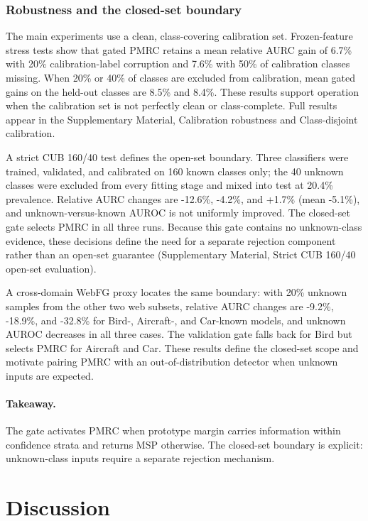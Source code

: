 \documentclass[review,times]{elsarticle}
\begin{document}
\subsubsection{Robustness and the closed-set boundary}

The main experiments use a clean, class-covering calibration set. Frozen-feature stress tests show that gated PMRC retains a mean relative AURC gain of 6.7\% with 20\% calibration-label corruption and 7.6\% with 50\% of calibration classes missing. When 20\% or 40\% of classes are excluded from calibration, mean gated gains on the held-out classes are 8.5\% and 8.4\%. These results support operation when the calibration set is not perfectly clean or class-complete. Full results appear in the Supplementary Material, Calibration robustness and Class-disjoint calibration.

A strict CUB 160/40 test defines the open-set boundary. Three classifiers were trained, validated, and calibrated on 160 known classes only; the 40 unknown classes were excluded from every fitting stage and mixed into test at 20.4\% prevalence. Relative AURC changes are -12.6\%, -4.2\%, and +1.7\% (mean -5.1\%), and unknown-versus-known AUROC is not uniformly improved. The closed-set gate selects PMRC in all three runs. Because this gate contains no unknown-class evidence, these decisions define the need for a separate rejection component rather than an open-set guarantee (Supplementary Material, Strict CUB 160/40 open-set evaluation).

A cross-domain WebFG proxy locates the same boundary: with 20\% unknown samples from the other two web subsets, relative AURC changes are -9.2\%, -18.9\%, and -32.8\% for Bird-, Aircraft-, and Car-known models, and unknown AUROC decreases in all three cases. The validation gate falls back for Bird but selects PMRC for Aircraft and Car. These results define the closed-set scope and motivate pairing PMRC with an out-of-distribution detector when unknown inputs are expected.

\paragraph{Takeaway.} The gate activates PMRC when prototype margin carries information within confidence strata and returns MSP otherwise. The closed-set boundary is explicit: unknown-class inputs require a separate rejection mechanism.

\section{Discussion}
\end{document}
